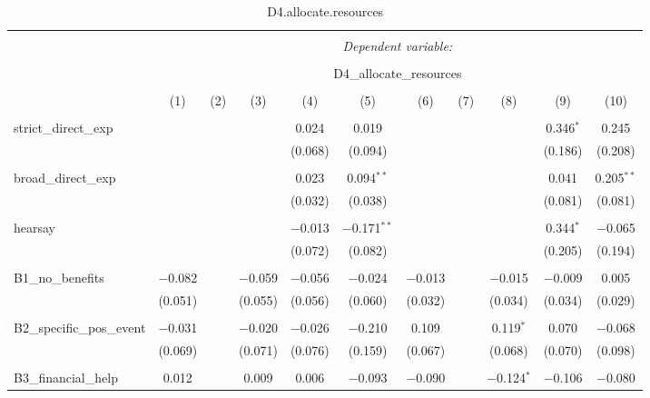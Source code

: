 
\begin{table}[H] \centering 
  \caption{D4.allocate.resources} 
  \label{} 
\tiny 
\begin{tabular}{@{\extracolsep{4pt}}lcccccccccc} 
\\[-1.8ex]\hline 
\hline \\[-1.8ex] 
 & \multicolumn{10}{c}{\textit{Dependent variable:}} \\ 
\cline{2-11} 
\\[-1.8ex] & \multicolumn{10}{c}{D4\_allocate\_resources} \\ 
\\[-1.8ex] & (1) & (2) & (3) & (4) & (5) & (6) & (7) & (8) & (9) & (10)\\ 
\hline \\[-1.8ex] 
 strict\_direct\_exp &  &  &  & 0.024 & 0.019 &  &  &  & 0.346$^{*}$ & 0.245 \\ 
  &  &  &  & (0.068) & (0.094) &  &  &  & (0.186) & (0.208) \\ 
  & & & & & & & & & & \\ 
 broad\_direct\_exp &  &  &  & 0.023 & 0.094$^{**}$ &  &  &  & 0.041 & 0.205$^{**}$ \\ 
  &  &  &  & (0.032) & (0.038) &  &  &  & (0.081) & (0.081) \\ 
  & & & & & & & & & & \\ 
 hearsay &  &  &  & $-$0.013 & $-$0.171$^{**}$ &  &  &  & 0.344$^{*}$ & $-$0.065 \\ 
  &  &  &  & (0.072) & (0.082) &  &  &  & (0.205) & (0.194) \\ 
  & & & & & & & & & & \\ 
 B1\_no\_benefits & $-$0.082 &  & $-$0.059 & $-$0.056 & $-$0.024 & $-$0.013 &  & $-$0.015 & $-$0.009 & 0.005 \\ 
  & (0.051) &  & (0.055) & (0.056) & (0.060) & (0.032) &  & (0.034) & (0.034) & (0.029) \\ 
  & & & & & & & & & & \\ 
 B2\_specific\_pos\_event & $-$0.031 &  & $-$0.020 & $-$0.026 & $-$0.210 & 0.109 &  & 0.119$^{*}$ & 0.070 & $-$0.068 \\ 
  & (0.069) &  & (0.071) & (0.076) & (0.159) & (0.067) &  & (0.068) & (0.070) & (0.098) \\ 
  & & & & & & & & & & \\ 
 B3\_financial\_help & 0.012 &  & 0.009 & 0.006 & $-$0.093 & $-$0.090 &  & $-$0.124$^{*}$ & $-$0.106 & $-$0.080 \\ 

\end{tabular}
\end{table}
